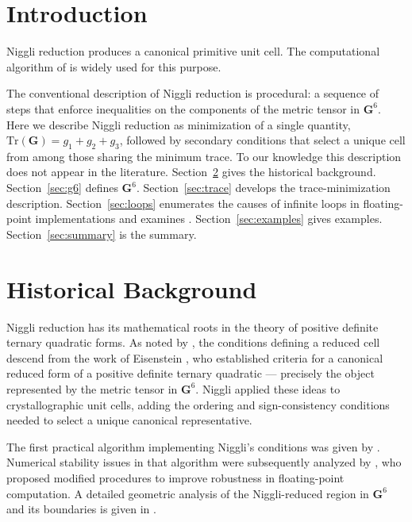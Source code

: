 \documentclass[preprint]{iucr}              %
\numberwithin{equation}{section}
\newcommand{\GVI}{\ensuremath{\mathbf{G}^{6}}}
\begin{document}
	
	\section{Introduction}
	
	Niggli reduction \cite{Niggli1928} produces a canonical primitive unit
	cell. The computational algorithm of  is widely
	used for this purpose.
	
	The conventional description of Niggli reduction is procedural: a
	sequence of steps that enforce inequalities on the components of the
	metric tensor in \GVI{}. Here we describe Niggli reduction as
	minimization of a single quantity, $\mathrm{Tr}(\mathbf{G}) =
	g_1 + g_2 + g_3$, followed by secondary conditions that select a
	unique cell from among those sharing the minimum trace. To our
	knowledge this description does not appear in the literature.
	Section~\ref{sec:history} gives the historical background.
	Section~\ref{sec:g6} defines \GVI{}.
	Section~\ref{sec:trace} develops the trace-minimization description.
	Section~\ref{sec:loops} enumerates the causes of infinite loops in
	floating-point implementations and examines .
	Section~\ref{sec:examples} gives examples.
	Section~\ref{sec:summary} is the summary.
	
	
	\section{Historical Background}
	\label{sec:history}
	
	Niggli reduction has its mathematical roots in the theory of positive
	definite ternary quadratic forms. As noted by ,
	the conditions defining a reduced cell descend from the work of
	Eisenstein \cite{Eisenstein1851}, who established criteria for a
	canonical reduced form of a positive definite ternary quadratic ---
	precisely the object represented by the metric tensor in \GVI{}.
	Niggli \cite{Niggli1928} applied these ideas to crystallographic unit
	cells, adding the ordering and sign-consistency conditions needed to
	select a unique canonical representative.
	
	The first practical algorithm implementing Niggli's conditions was given
	by . Numerical stability issues in that algorithm
	were subsequently analyzed by , who
	proposed modified procedures to improve robustness in floating-point
	computation. A detailed geometric analysis of the Niggli-reduced region
	in \GVI{} and its boundaries is given in .
	
\end{document}
